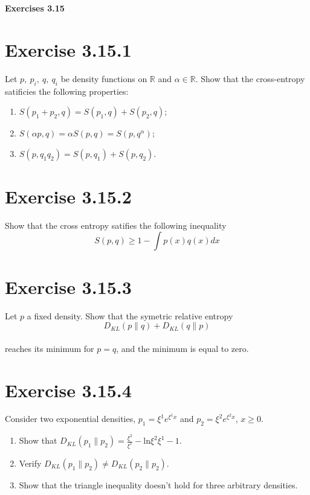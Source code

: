 \documentclass{exam}
\begin{document}
\begin{center}
    \textbf{\Large Exercises 3.15 }
\end{center}

\section*{Exercise 3.15.1}
Let $p, \ p_i, \ q, \ q_i$ be density functions on $\mathbb{R}$ and $\alpha \in \mathbb{R}$. Show that the cross-entropy satificies the following properties:
\begin{enumerate}
    \item $S(p_1 + p_2,q) = S(p_1,q) + S(p_2,q)$;
    \item $S(\alpha p,q) = \alpha S(p,q) = S(p,q^{\alpha})$;
    \item $S(p, q_1 q_2) = S(p,q_1) + S(p,q_2)$.
\end{enumerate}

\section*{Exercise 3.15.2}
Show that the cross entropy satifies the following inequality\\
\begin{equation*}
    S(p,q) \geq 1 - \displaystyle\int p(x) q(x) d x
\end{equation*}    

\section*{Exercise 3.15.3}
Let $p$ a fixed density. Show that the symetric relative entropy \\
\begin{equation*}
    D_{KL}(p \lVert q) +  D_{KL}(q \lVert p )
\end{equation*}\\
reaches its minimum for $p = q$, and the minimum is equal to zero. 

\section*{Exercise 3.15.4}
Consider two exponential densities, $p_1 = \xi^1 e^{\xi^1 x}$ and $p_2 = \xi^2 e^{\xi^2 x}$, $x \geq 0$.
\begin{enumerate}
    \item Show that $D_{KL}(p_1 \lVert p_2) = \displaystyle \frac{\xi^2}{\xi^1} - \text{ln}{\xi^2}{\xi^1} - 1$.  
    \item Verify $D_{KL}(p_1 \lVert p_2) \neq D_{KL}(p_2 \lVert p_2 )$.
    \item Show that the triangle inequality doesn't hold for three arbitrary densities. 
\end{enumerate}    
\end{document}
